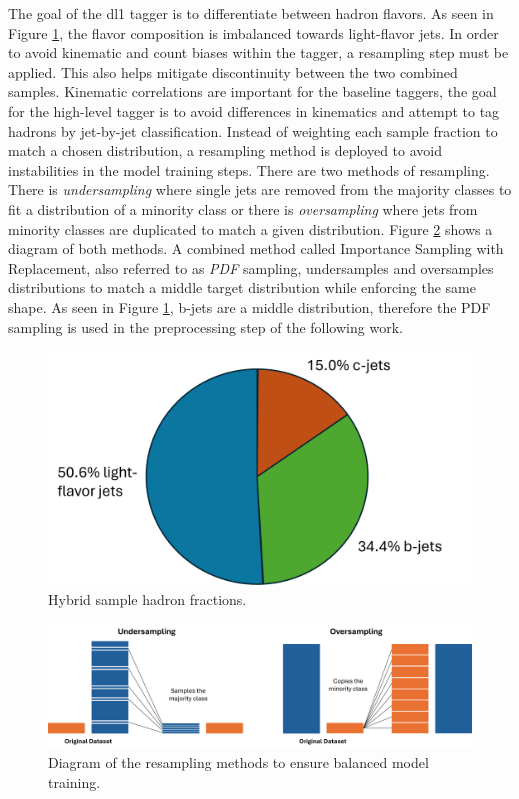The goal of the \gls{dl1} tagger is to differentiate between hadron flavors. As seen in Figure \ref{fig:sample_fractions}, the flavor composition is imbalanced towards light-flavor 
jets. In order to avoid kinematic and count biases within the tagger, a resampling step must be applied. This also helps mitigate discontinuity between the two 
combined samples. Kinematic correlations are important for the baseline taggers, the goal for the high-level tagger is to avoid differences in kinematics and attempt to tag hadrons 
by jet-by-jet classification. Instead of weighting each sample fraction to match a chosen distribution, a resampling method is deployed to avoid instabilities in the model training 
steps. There are two methods of resampling. There is \textit{undersampling} where single jets are removed from the majority classes to fit a distribution of a minority class or 
there is \textit{oversampling} where jets from minority classes are duplicated to match a given distribution. Figure \ref{fig:resampling_diagram} shows a diagram of both methods. A combined method called 
Importance Sampling with Replacement, also referred to as \textit{PDF} sampling, undersamples and oversamples distributions to match a middle target distribution while enforcing the 
same shape. As seen in Figure \ref{fig:sample_fractions}, b-jets are a middle distribution, therefore the PDF sampling is used in the preprocessing step of the following work.

\begin{figure}[h]
    \centering
    \includegraphics[scale=0.6]{figs/ch5/ex_comp_pie.png}
    \caption{ Hybrid sample hadron fractions.}
\label{fig:sample_fractions}
\end{figure}

\begin{figure}[h]
    \centering
    \includegraphics[scale=0.5]{figs/ch5/Sampling-diagram.png}
    \caption{ Diagram of the resampling methods to ensure balanced model training.}
\label{fig:resampling_diagram}
\end{figure}

